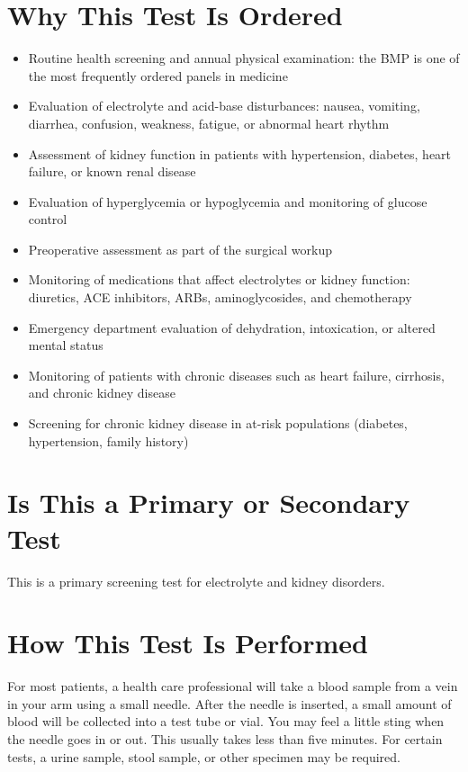 \section*{Why This Test Is Ordered}
\begin{itemize}
  \item Routine health screening and annual physical examination: the BMP is one of the most frequently ordered panels in medicine
  \item Evaluation of electrolyte and acid-base disturbances: nausea, vomiting, diarrhea, confusion, weakness, fatigue, or abnormal heart rhythm
  \item Assessment of kidney function in patients with hypertension, diabetes, heart failure, or known renal disease
  \item Evaluation of hyperglycemia or hypoglycemia and monitoring of glucose control
  \item Preoperative assessment as part of the surgical workup
  \item Monitoring of medications that affect electrolytes or kidney function: diuretics, ACE inhibitors, ARBs, aminoglycosides, and chemotherapy
  \item Emergency department evaluation of dehydration, intoxication, or altered mental status
  \item Monitoring of patients with chronic diseases such as heart failure, cirrhosis, and chronic kidney disease
  \item Screening for chronic kidney disease in at-risk populations (diabetes, hypertension, family history)
\end{itemize}

\section*{Is This a Primary or Secondary Test}
This is a primary screening test for electrolyte and kidney disorders.

\section*{How This Test Is Performed}
For most patients, a health care professional will take a blood sample from a vein in your arm using a small needle. After the needle is inserted, a small amount of blood will be collected into a test tube or vial. You may feel a little sting when the needle goes in or out. This usually takes less than five minutes. For certain tests, a urine sample, stool sample, or other specimen may be required.


